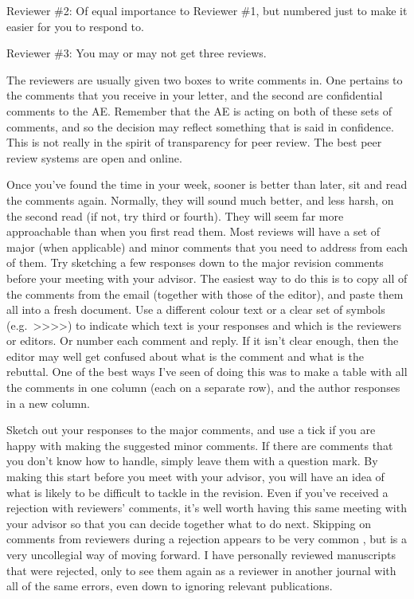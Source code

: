 \documentclass[
]{krantz}
\renewenvironment{quote}{\begin{VF}}{\end{VF}}
\begin{document}
\begin{quote}
Reviewer \#2: Of equal importance to Reviewer \#1, but numbered just to make it easier for you to respond to.
\end{quote}

\begin{quote}
Reviewer \#3: You may or may not get three reviews.
\end{quote}

The reviewers are usually given two boxes to write comments in. One pertains to the comments that you receive in your letter, and the second are confidential comments to the AE. Remember that the AE is acting on both of these sets of comments, and so the decision may reflect something that is said in confidence. This is not really in the spirit of transparency for peer review. The best peer review systems are open and online.

Once you've found the time in your week, sooner is better than later, sit and read the comments again. Normally, they will sound much better, and less harsh, on the second read (if not, try third or fourth). They will seem far more approachable than when you first read them. Most reviews will have a set of major (when applicable) and minor comments that you need to address from each of them. Try sketching a few responses down to the major revision comments before your meeting with your advisor. The easiest way to do this is to copy all of the comments from the email (together with those of the editor), and paste them all into a fresh document. Use a different colour text or a clear set of symbols (e.g.~\textgreater\textgreater\textgreater\textgreater) to indicate which text is your responses and which is the reviewers or editors. Or number each comment and reply. If it isn't clear enough, then the editor may well get confused about what is the comment and what is the rebuttal. One of the best ways I've seen of doing this was to make a table with all the comments in one column (each on a separate row), and the author responses in a new column.

Sketch out your responses to the major comments, and use a tick if you are happy with making the suggested minor comments. If there are comments that you don't know how to handle, simply leave them with a question mark. By making this start before you meet with your advisor, you will have an idea of what is likely to be difficult to tackle in the revision. Even if you've received a rejection with reviewers' comments, it's well worth having this same meeting with your advisor so that you can decide together what to do next. Skipping on comments from reviewers during a rejection appears to be very common \citep{crijns2021effect}, but is a very uncollegial way of moving forward. I have personally reviewed manuscripts that were rejected, only to see them again as a reviewer in another journal with all of the same errors, even down to ignoring relevant publications.
\end{document}
